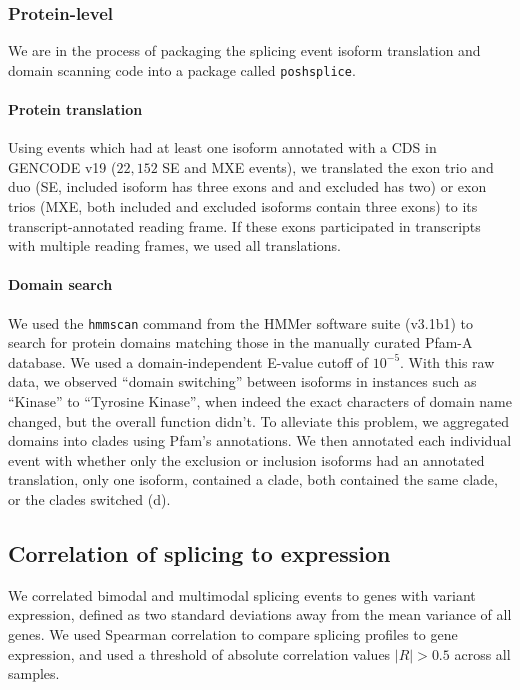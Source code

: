 \subsubsection{Protein-level}

We are in the process of packaging the splicing event isoform translation and domain scanning code into a package called \texttt{poshsplice}\cite{Anonymous:poshsplice}.

\paragraph{Protein translation}
Using events which had at least one isoform annotated with a CDS in GENCODE v19 ($22,152$ SE and MXE events), we translated the exon trio and duo (SE, included isoform has three exons and and excluded has two) or exon trios (MXE, both included and excluded isoforms contain three exons) to its transcript-annotated reading frame. If these exons participated in transcripts with multiple reading frames, we used all translations.

\paragraph{Domain search} We used the \texttt{hmmscan} command from the HMMer\cite{Finn:2011eg,Eddy:1998ut} software suite (v3.1b1) to search for protein domains matching those in the manually curated Pfam-A database\cite{Finn:2016bf}. We used a domain-independent E-value cutoff of $10^{-5}$. With this raw data, we observed ``domain switching'' between isoforms in instances such as ``Kinase'' to ``Tyrosine Kinase'', when indeed the exact characters of domain name changed, but the overall function didn't. To alleviate this problem, we aggregated domains into clades using Pfam's annotations. We then annotated each individual event with whether only the exclusion or inclusion isoforms had an annotated translation, only one isoform, contained a clade, both contained the same clade, or the clades switched (d).

\subsection{Correlation of splicing to expression}
We correlated bimodal and multimodal splicing events to genes with variant expression, defined as two standard deviations away from the mean variance of all genes. We used Spearman correlation to compare splicing profiles to gene expression, and used a threshold of absolute correlation values $|R| > 0.5$ across all samples.

